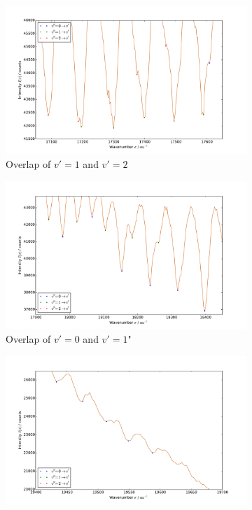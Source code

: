 \begin{figure}
    \centering
    \begin{subfigure}[b]{\mpltw}
        \includegraphics[width=\textwidth]{analysis/figures/absorp_03_detail_01.pdf}
        \caption{Overlap of $v'=1$ and $v'=2$}
        \label{fig:absorp_detail_01}
    \end{subfigure}\qquad
    \begin{subfigure}[b]{\mpltw}
        \includegraphics[width=\textwidth]{analysis/figures/absorp_03_detail_02.pdf}
        \caption{Overlap of $v'=0$ and $v'=1$"}
        \label{fig:absorp_detail_02}
    \end{subfigure}
    \begin{subfigure}[b]{\mpltw}
        \includegraphics[width=\textwidth]{analysis/figures/absorp_03_detail_03.pdf}

\end{subfigure}
\end{figure}
